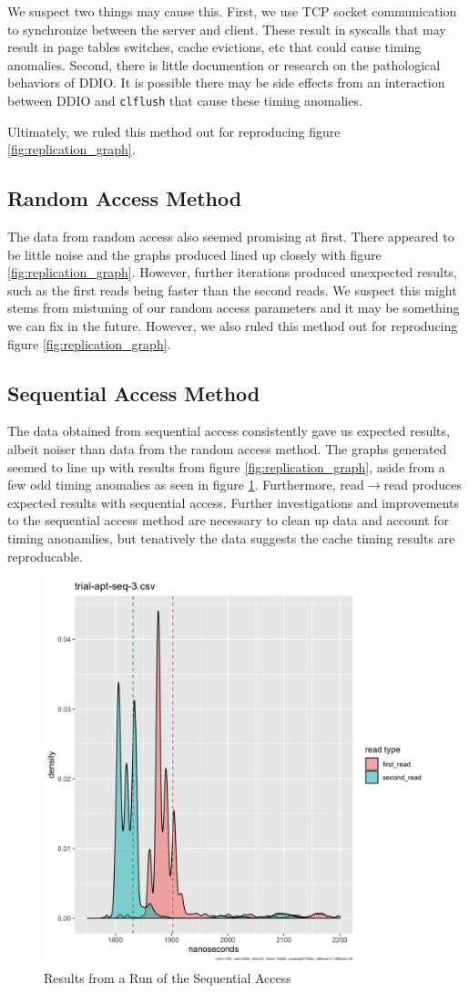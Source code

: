 \documentclass[twocolumn]{article}
\begin{document}
We suspect two things may cause this.
First, we use TCP socket communication to synchronize between the server and client.
These result in syscalls that may result in page tables switches, cache evictions, etc that could cause timing anomalies.
Second, there is little documention or research on the pathological behaviors of DDIO.
It is possible there may be side effects from an interaction between DDIO and \texttt{clflush} that cause these timing anomalies.

Ultimately, we ruled this method out for reproducing figure \ref{fig:replication_graph}.

\subsection{Random Access Method}
The data from random access also seemed promising at first.
There appeared to be little noise and the graphs produced lined up closely with figure \ref{fig:replication_graph}.
However, further iterations produced unexpected results, such as the first reads being faster than the second reads.
We suspect this might stems from mistuning of our random access parameters and it may be something we can fix in the future.
However, we also ruled this method out for reproducing figure \ref{fig:replication_graph}.

\subsection{Sequential Access Method}
The data obtained from sequential access consistently gave us expected results, albeit noiser than data from the random access method.
The graphs generated seemed to line up with results from figure \ref{fig:replication_graph}, aside from a few odd timing anomalies as seen in figure \ref{fig:seq_access}.
Furthermore, read$\rightarrow$read produces expected results with sequential access.
Further investigations and improvements to the sequential access method are necessary to clean up data and account for timing anonamlies, but tenatively the data suggests the cache timing results are reproducable.

\begin{figure}
 \centering
 \includegraphics[width=.40\textwidth]{trial-apt-seq-3-histogram.png}
 \caption{Results from a Run of the Sequential Access}
 \label{fig:seq_access}
\end{figure}
\end{document}

